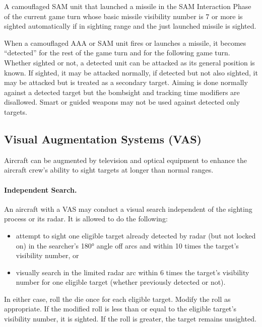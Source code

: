 A camouflaged SAM unit that launched a missile in the SAM Interaction Phase of the current game turn whose basic missile visibility number is 7 or more is sighted automatically if in sighting range and the just launched missile is sighted.

When a camouflaged AAA or SAM unit fires or launches a missile, it becomes “detected” for the rest of the game turn and for the following game turn. Whether sighted or not, a detected unit can be attacked as its general position is known. If sighted, it may be attacked normally, if detected but not also sighted, it may be attacked but is treated as a secondary target. Aiming is done normally against a detected target but the bombsight and tracking time modifiers are disallowed. Smart or guided weapons may not be used against detected only targets.

\advancedrules

\subsection{Visual Augmentation Systems (VAS)}

Aircraft can be augmented by television and optical equipment to enhance the aircraft crew's ability to sight targets at longer than normal ranges.

\paragraph{Independent Search.} An aircraft with a VAS may conduct a visual search independent of the sighting process or its radar. It is allowed to do the following:

\begin{itemize}

    \item attempt to sight one eligible target already detected by radar (but not locked on) in the searcher's 180° angle off arcs and within 10 times the target's visibility number, or

    \item visually search in the limited radar arc within 6 times the target's visibility number for one eligible target (whether previously detected or not).

\end{itemize}

In either case, roll the die once for each eligible target. Modify the roll as appropriate. If the modified roll is less than or equal to the eligible target's visibility number, it is sighted. If the roll is greater, the target remains unsighted.


